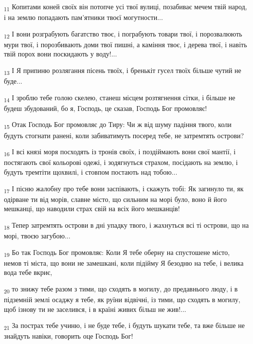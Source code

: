 \begin{tcolorbox}
\textsubscript{11} Копитами коней своїх він потопче усі твої вулиці, позабиває мечем твій народ, і на землю попадають пам'ятники твоєї могутности...
\end{tcolorbox}
\begin{tcolorbox}
\textsubscript{12} І вони розграбують багатство твоє, і пограбують товари твої, і порозвалюють мури твої, і порозбивають доми твої пишні, а каміння твоє, і дерева твої, і навіть твій порох вони поскидають у воду!...
\end{tcolorbox}
\begin{tcolorbox}
\textsubscript{13} І Я припиню розлягання пісень твоїх, і бренькіт гусел твоїх більше чутий не буде...
\end{tcolorbox}
\begin{tcolorbox}
\textsubscript{14} І зроблю тебе голою скелею, станеш місцем розтягнення сітки, і більше не будеш збудований, бо я, Господь, це сказав, Господь Бог промовляє!
\end{tcolorbox}
\begin{tcolorbox}
\textsubscript{15} Отак Господь Бог промовляє до Тиру: Чи ж від шуму падіння твого, коли будуть стогнати ранені, коли забиватимуть посеред тебе, не затремтять острови?
\end{tcolorbox}
\begin{tcolorbox}
\textsubscript{16} І всі князі моря посходять із тронів своїх, і поздіймають вони свої мантії, і постягають свої кольорові одежі, і зодягнуться страхом, посідають на землю, і будуть тремтіти щохвилі, і стовпом постають над тобою...
\end{tcolorbox}
\begin{tcolorbox}
\textsubscript{17} І пісню жалобну про тебе вони заспівають, і скажуть тобі: Як загинуло ти, як одірване ти від морів, славне місто, що сильним на морі було, воно й його мешканці, що наводили страх свій на всіх його мешканців!
\end{tcolorbox}
\begin{tcolorbox}
\textsubscript{18} Тепер затремтять острови в дні упадку твого, і жахнуться всі ті острови, що на морі, твоєю загубою...
\end{tcolorbox}
\begin{tcolorbox}
\textsubscript{19} Бо так Господь Бог промовляє: Коли Я тебе оберну на спустошене місто, немов ті міста, що вони не замешкані, коли підійму Я безодню на тебе, і велика вода тебе вкриє,
\end{tcolorbox}
\begin{tcolorbox}
\textsubscript{20} то знижу тебе разом з тими, що сходять в могилу, до предавнього люду, і в підземній землі осаджу я тебе, як руїни відвічні, із тими, що сходять в могилу, щоб ізнову ти не заселився, і в країні живих більш не жив!...
\end{tcolorbox}
\begin{tcolorbox}
\textsubscript{21} За пострах тебе учиню, і не буде тебе, і будуть шукати тебе, та вже більше не знайдуть навіки, говорить оце Господь Бог!
\end{tcolorbox}
